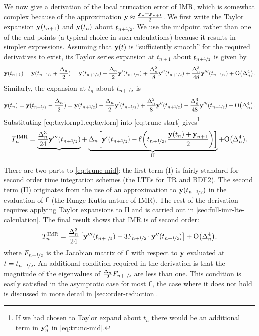 We now give a derivation of the local truncation error of IMR, which is somewhat complex because of the approximation $\boldsymbol{\mathrm{y}} \approx \frac{\boldsymbol{\mathrm{y}}_n + \boldsymbol{\mathrm{y}}_{n+1}}{2}$.
We first write the Taylor expansion $\boldsymbol{\mathrm{y}}(t_{n+1})$ and $\boldsymbol{\mathrm{y}}(t_{n})$ about $t_{n+\nicefrac{1}{2}}$.
We use the midpoint rather than one of the end points (a typical choice in such calculations) because it results in simpler expressions.
Assuming that $\boldsymbol{\mathrm{y}}(t)$ is ``sufficiently smooth'' for the required derivatives to exist, its Taylor series expansion at $t_{n+1}$ about $t_{n+\nicefrac{1}{2}}$ is given by
\begin{equation}
  \yv(t_{n+1}) = \yv(\thf + \frac{\dtn}{2}) = \yvhf + \frac{\dtn}{2} \yvhf[']
  + \frac{\dtn^2}{8} \yvhf['']
  + \frac{\dtn^3}{48} \yvhf[''']
  + \order{\dtn^4}.
  \label{eq:taylornp1}
\end{equation}
Similarly, the expansion at $t_n$ about $t_{n+\nicefrac{1}{2}}$ is
\begin{equation}
  \yv(t_n) = \yv(\thf - \frac{\dtn}{2}) = \yvhf - \frac{\dtn}{2} \yvhf[']
  + \frac{\dtn^2}{8} \yvhf['']
  - \frac{\dtn^3}{48} \yvhf[''']
  + \order{\dtn^4}.
  \label{eq:taylorn}
\end{equation}
Substituting \cref{eq:taylornp1,eq:taylorn} into \cref{eq:trunc-start} gives\footnote{If we had chosen to Taylor expand about $t_n$ there would be an additional term in $\boldsymbol{\mathrm{y}}_n''$ in \cref{eq:trunc-mid}.}
\begin{equation}
  \lte^\imr = \underbrace{\frac{\dtn^3}{24} \yvhf[''']}_{\text{I}}
  + \underbrace{\dtn\bigs{ \yvhf['] - \ffv{\thf, \frac{\yv(t_n) + \yv_{n+1}}{2}} }}_{\text{II}}
  + \order{\dtn^4}.
  \label{eq:trunc-mid}
\end{equation}

There are two parts to \cref{eq:trunc-mid}: the first term (I) is fairly standard for second order time integration schemes (\cf the LTEs for TR and BDF2).
The second term (II) originates from the use of an approximation to $\boldsymbol{\mathrm{y}}(t_{n+\nicefrac{1}{2}})$ in the evaluation of ${\boldsymbol{\mathrm{f}}}$ (\ie the Runge-Kutta nature of IMR).
The rest of the derivation requires applying Taylor expansions to II and is carried out in \cref{sec:full-imr-lte-calculation}.
The final result shows that IMR is of second order:
\begin{equation}
  \lte^\imr = \frac{\dtn^3}{24} \left[\yvhf['''] - 3 \dfdyhf \cdot \yvhf[''] \right]
  + \order{\dtn^4},
  \label{eq:trunc-final}
\end{equation}
where $F_{n+\nicefrac{1}{2}}$ is the Jacobian matrix of ${\boldsymbol{\mathrm{f}}}$ with respect to $\boldsymbol{\mathrm{y}}$ evaluated at $t=t_{n+\nicefrac{1}{2}}$.
An additional condition required in the derivation is that the magnitude of the eigenvalues of $\frac{\Delta_{n}}{2}F_{n+\nicefrac{1}{2}}$ are less than one.
This condition is easily satisfied in the asymptotic case for most ${\boldsymbol{\mathrm{f}}}$, the case where it does not hold is discussed in more detail in \cref{sec:order-reduction}.

